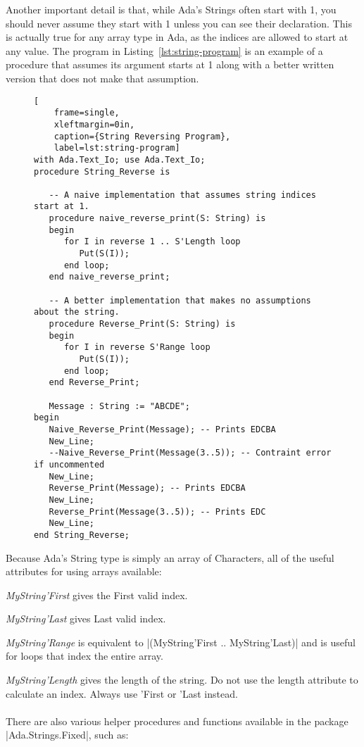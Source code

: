 Another important detail is that, while Ada's Strings often start with 1, you should never
assume they start with 1 unless you can see their declaration. This is actually true for any
array type in Ada, as the indices are allowed to start at any value. The program in
Listing~\ref{lst:string-program} is an example of a procedure that assumes its argument starts
at 1 along with a better written version that does not make that assumption.

\begin{figure}[tbhp]
\begin{lstlisting}[
    frame=single,
    xleftmargin=0in,
    caption={String Reversing Program},
    label=lst:string-program]
with Ada.Text_Io; use Ada.Text_Io;
procedure String_Reverse is

   -- A naive implementation that assumes string indices start at 1.
   procedure naive_reverse_print(S: String) is
   begin
      for I in reverse 1 .. S'Length loop
         Put(S(I));
      end loop;
   end naive_reverse_print;

   -- A better implementation that makes no assumptions about the string.
   procedure Reverse_Print(S: String) is
   begin
      for I in reverse S'Range loop
         Put(S(I));
      end loop;
   end Reverse_Print;

   Message : String := "ABCDE";
begin
   Naive_Reverse_Print(Message); -- Prints EDCBA
   New_Line;
   --Naive_Reverse_Print(Message(3..5)); -- Contraint error if uncommented
   New_Line;
   Reverse_Print(Message); -- Prints EDCBA
   New_Line;
   Reverse_Print(Message(3..5)); -- Prints EDC
   New_Line;
end String_Reverse;   
\end{lstlisting}    
\end{figure}


Because Ada's String type is simply an array of Characters, all of the useful attributes for
using arrays available:

\emph{MyString'First} gives the First valid index.

\emph{MyString'Last} gives Last valid index.

\emph{MyString'Range} is equivalent to |(MyString'First .. MyString'Last)| and is useful for
loops that index the entire array.

\emph{MyString'Length} gives the length of the string. Do not use the length attribute to
calculate an index. Always use 'First or 'Last instead.
\\\\ %
There are also various helper procedures and functions available in the package
|Ada.Strings.Fixed|, such as:

